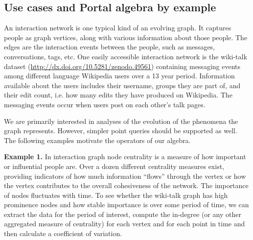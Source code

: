 \subsection{Use cases and Portal algebra by example}
\label{sec:cases}

An interaction network is one typical kind of an evolving graph.  It
captures people as graph vertices, along with various information
about those people.  The edges are the interaction events between the
people, such as messages, conversations, tags, etc.  One easily
accessible interaction network is the wiki-talk dataset
(\url{http://dx.doi.org/10.5281/zenodo.49561}) containing messaging
events among different language Wikipedia users over a 13 year period.
Information available about the users includes their username, groups
they are part of, and their edit count, i.e. how many edits they have
produced on Wikipedia.  The messaging events occur when users post on
each other's talk pages.

We are primarily interested in analyses of the evolution of the
phenomena the graph represents.  However, simpler point queries should
be supported as well.  The following examples motivate the operators
of our algebra.

{\bf Example 1.}  In interaction graph node centrality is a measure
of how important or influential people are.  Over a dozen different
centrality measures exist, providing indicators of how much
information ``flows'' through the vertex or how the vertex contributes
to the overall cohesiveness of the network.  The importance of nodes
fluctuates with time.  To see whether the wiki-talk graph has high
prominence nodes and how stable importance is over some period of
time, we can extract the data for the period of interest, compute the
in-degree (or any other aggregated measure of centrality) for each
vertex and for each point in time and then calculate a coefficient of
variation.


